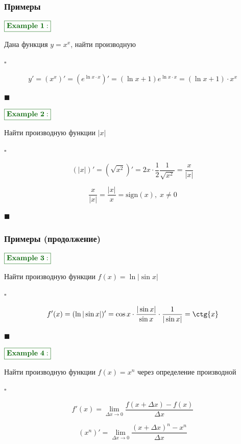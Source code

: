 \documentclass[8pt, aspectratio=169]{beamer}
\newcommand{\Ex}[1]{{\color{darkgreen}\boxed{\color{darkgreen}\mathbf{Example~#1:}}}}
\begin{document}
\begin{frame}
\begin{columns}[T, onlytextwidth]
    \end{columns}
\end{frame}

\begin{frame}
\frametitle{Примеры}

$\Ex{1}$

Дана функция $y = x^x$, найти производную

$\square$

$$
y' = (x^x)' = (e^{\ln{x}\cdot x})' = (\ln{x} + 1)e^{\ln{x} \cdot x} = (\ln{x} + 1)\cdot x^x
$$

$\blacksquare$

\vspace{0.5cm}

$\Ex{2}$

Найти производную функции $|x|$

$\square$

$$
(|x|)' = (\sqrt{x^2})'=2x \cdot \frac{1}{2}\frac{1}{\sqrt{x^2}} = \frac{x}{|x|}
$$

$$
\frac{x}{|x|} = \frac{|x|}{x} = \text{sign}(x), \; x \ne 0
$$

$\blacksquare$
\end{frame}

\begin{frame}
\frametitle{Примеры (продолжение)}

$\Ex{3}$

Найти производную функции $f(x) = \ln{|\sin{x}|}$

$\square$

$$
f'(x) = (\ln{|\sin{x}|})'=\cos{x} \cdot \frac{|\sin{x}|}{\sin{x}} \cdot \frac{1}{|\sin{x}|} = \ctg{x}
$$

$\blacksquare$

\vspace{0.5cm}

$\Ex{4}$

Найти производную функции $f(x) = x^n$ через определение производной

$\square$

$$f'(x) = \lim_{\Delta x \to 0} \frac{f(x + \Delta x) - f(x)}{\Delta x}$$

$$(x^n)' = \lim_{\Delta x \to 0} \frac{(x + \Delta x)^n - x^n}{\Delta x}$$

\end{frame}
\end{document}
